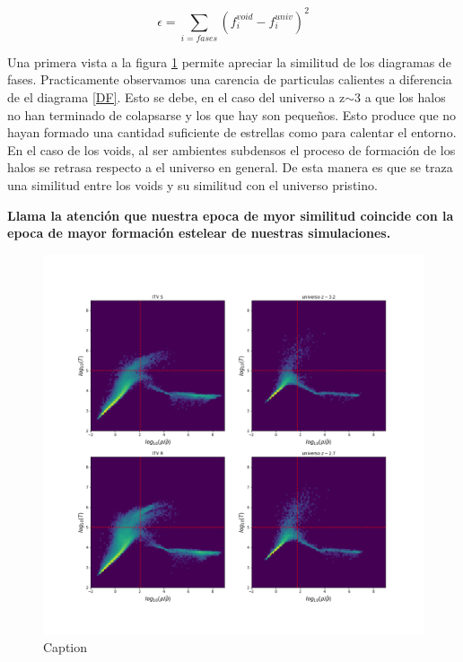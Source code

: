 \begin{equation}
    \epsilon=\sum_{i=fases}(f^{void}_{i}-f^{univ}_{i})^{2}
    \label{ErrorFormula}
\end{equation}{}


Una primera vista a la figura \ref{TimeMachine} permite apreciar la similitud de los diagramas de fases. Practicamente observamos una carencia de particulas calientes a diferencia de el diagrama \ref{DF}. Esto se debe, en el caso del universo a z$\sim$3 a que los halos no han terminado de colapsarse y los que hay son peque\~nos. Esto produce que no hayan formado una cantidad suficiente de estrellas como para calentar el entorno. En el caso de los voids, al ser ambientes subdensos el proceso de formaci\'on de los halos se retrasa respecto a el universo en general. De esta manera es que se traza una similitud entre los voids y su similitud con el universo pristino. 

\textbf{Llama la atenci\'on que nuestra epoca de myor similitud coincide con la epoca de mayor formaci\'on estelear de nuestras simulaciones.}





\begin{figure}
    \centering
    \includegraphics[width=14cm]{Figures/TimeMachine_DF.png}
    \caption{Caption}
    \label{TimeMachine}
\end{figure}{}

